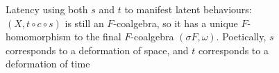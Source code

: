 \begin{figure}
    \centering
    \caption{Latency using both $s$ and $t$ to manifest latent behaviours: $(X,t\circ c\circ s)$ is still an $F$-coalgebra, so it has a unique $F$-homomorphism to the final $F$-coalgebra $(\sigma F, \omega)$. Poetically, $s$ corresponds to a deformation of  space, and $t$ corresponds to a deformation of time}
\end{figure}
